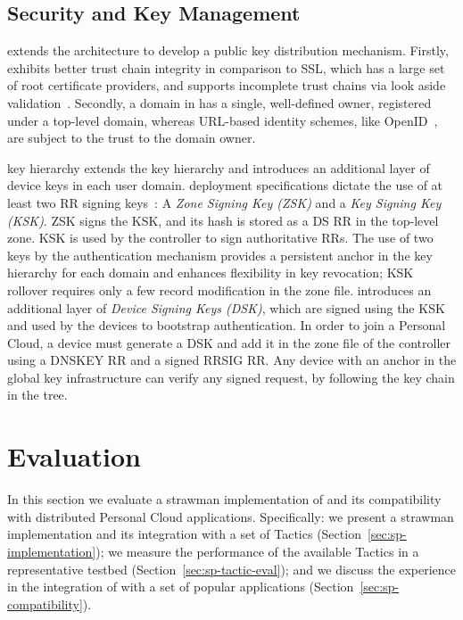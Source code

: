 \subsection{Security and Key Management} \label{signpost-security}

\signpost extends the \dnssec architecture to develop a public key
distribution mechanism.  Firstly, \dnssec exhibits better trust chain integrity
in comparison to SSL, which has a large set of root certificate providers, and
supports incomplete trust chains via look aside validation~.
Secondly, a domain in \dnssec has a single, well-defined owner, registered under
a top-level domain, whereas URL-based identity schemes, like
OpenID~, are subject to the trust to the domain owner.

\signpost key hierarchy extends the \dnssec key hierarchy and introduces an
additional layer of device keys in each user domain. \dnssec deployment
specifications dictate the use of at least two RR signing
keys~: A \textit{Zone Signing Key (ZSK)} and a \textit{Key
Signing Key (KSK)}.  ZSK signs the KSK, and its hash is stored as a DS RR in
the top-level zone. KSK is used by the controller to sign authoritative RRs\@.
The use of two keys by the authentication mechanism provides a persistent
anchor in the \dnssec key hierarchy for each domain and enhances flexibility in
key revocation; KSK rollover requires only a few record modification in the
zone file.  \signpost introduces an additional layer of \textit{Device Signing
Keys (DSK)}, which are signed using the KSK and used by the devices to
bootstrap authentication.  In order to join a Personal Cloud, a device must
generate a DSK and add it in the zone file of the \signpost controller using a
DNSKEY RR and a signed RRSIG RR\@. Any device with an anchor in the global
\dnssec key infrastructure can verify any \signpost signed request, by
following the key chain in the \dnssec tree.

\section{Evaluation}\label{sec:signpost-evaluation}

In this section we evaluate a strawman implementation of \signpost and its
compatibility with distributed Personal Cloud applications.  Specifically: we
present a strawman \signpost implementation and its integration with a set of
Tactics (Section~\ref{sec:sp-implementation}); we measure the performance of
the available \signpost Tactics in a representative testbed
(Section~\ref{sec:sp-tactic-eval}); and we discuss the experience in the
integration of \signpost with a set of popular applications
(Section~\ref{sec:sp-compatibility}). 

